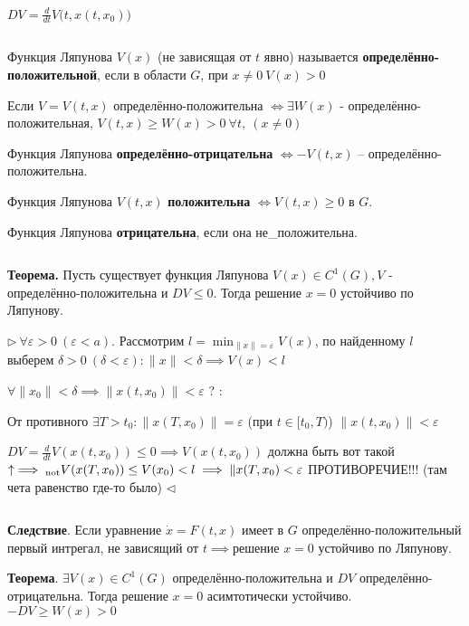\documentclass[12pt, a4paper]{article}
\begin{document}
    $DV = \frac{d}{dt}V\big(t, x(t, x_0)\big)$

    \par $ $ 

    Функция Ляпунова $V(x)$ (не зависящая от $t$ явно) называется \textbf{определённо-положительной}, если в области $G$, при $x \neq 0 \ V(x) > 0$ 

    Если $V=V(t,x)$ определённо-положительна $\iff \exists W(x)$ - определённо-положительная, $V (t,x)  \ge W(x) > 0 \ \forall t, \ (x\neq 0)$

    Функция Ляпунова \textbf{определённо-отрицательна} $\iff -V(t,x)$ -- определённо-положительна.

    Функция Ляпунова $V(t,x)$ \textbf{положительна} $\iff V(t,x) \ge 0$ в $G$.

    Функция Ляпунова \textbf{отрицательна}, если она не\_положительна.
    
    \par $ $

    \textbf{Теорема.} Пусть существует функция Ляпунова $V(x) \in C^1(G), V$ - определённо-положительна и $DV \le 0$. Тогда решение $x=0$ устойчиво по Ляпунову.
    
    $\triangleright \ \forall \varepsilon > 0 \ (\varepsilon < a)$. Рассмотрим $l = \min_{\|x\| = \varepsilon} V(x)$, по найденному $l$ выберем $\delta > 0 \ (\delta < \varepsilon) : \| x \| < \delta \implies V(x) < l $
    
    $\forall \| x_0 \| < \delta \implies \|x(t, x_0)\| < \varepsilon$ ? :

    От противного $\exists T > t_0: \| x(T, x_0) \| = \varepsilon$ (при $t \in [t_0, T)$) $\|x(t, x_0)\| < \varepsilon$

    $DV = \frac{d}{dt} V(x(t ,x_0)) \le 0 \implies V(x(t, x_0))$ должна быть вот такой $\uparrow \implies_{\text{not}}\\ V(x(T,x_0)) \le V(x_0) < l \implies \|x(T,x_0) < \varepsilon$ ПРОТИВОРЕЧИЕ!!! (там чета равенство где-то было) $\triangleleft$

    \par $ $

    \textbf{Следствие}. Если уравнение $\dot x = F(t,x)$ имеет в $G$ определённо-положительный первый интрегал, не зависящий от $t \implies \text{решение }x=0$ устойчиво по Ляпунову.

    \textbf{Теорема}. $\exists V(x) \in C^1(G)$ определённо-положительна и $DV$ определённо-отрицательна. Тогда решение $x=0$ асимтотически устойчиво. $-DV \ge W(x) > 0$
\end{document}
